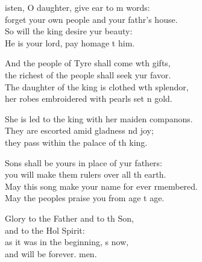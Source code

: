 \settowidth{\versewidth}{The daughter of the king is clothed with splendor, *}
\begin{psalmverse}%
  \begin{patverse}
isten, O daughter, give ear to m words:\Med\\
forget your own people and your fathr’s house.\\
So will the king desire yur beauty:\Med\\
He is your lord, pay homage t him.

And the people of Tyre shall come w\pointup{\i}th gifts,\Med\\
the richest of the people shall seek yur favor.\\
The daughter of the king is clothed w\pointup{\i}th splendor,\Med\\
her robes embroidered with pearls set \pointup{\i}n gold.

She is led to the king with her maiden compan\pointup{\i}ons.\Flex\\
They are escorted amid gladness nd joy;\Med\\
they pass within the palace of th king.

Sons shall be yours in place of yur fathers:\Med\\
you will make them rulers over all th earth.\\
May this song make your name for ever rmembered.\Med\\
May the peoples praise you from age t age.

Glory to the Father and to th Son,\Med\\
and to the Hol Spirit:\\
as it was in the beginning, \pointup{\i}s now,\Med\\
and will be forever. men. 
  \end{patverse}
\end{psalmverse}
